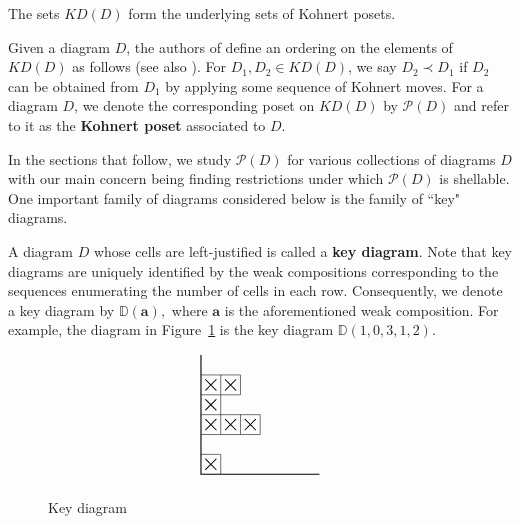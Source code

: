 \documentclass[letterpaper,10pt]{article}
\begin{document}
\noindent
The sets $KD(D)$ form the underlying sets of Kohnert posets.

Given a diagram $D$, the authors of \textbf{\cite{KP2}} define an ordering on the elements of $KD(D)$ as follows (see also \textbf{\cite{KP3}}). For $D_1,D_2\in KD(D)$, we say $D_2\prec D_1$ if $D_2$ can be obtained from $D_1$ by applying some sequence of Kohnert moves. For a diagram $D$, we denote the corresponding poset on $KD(D)$ by $\mathcal{P}(D)$ and refer to it as the \textbf{Kohnert poset} associated to $D$. 

 
In the sections that follow, we study $\mathcal{P}(D)$ for various collections of diagrams $D$ with our main concern being finding restrictions under which $\mathcal{P}(D)$ is shellable. One important family of diagrams considered below is the family of ``key" diagrams.

A diagram $D$ whose cells are left-justified is called a \textbf{key diagram}. Note that key diagrams are uniquely identified by the weak compositions corresponding to the sequences enumerating the number of cells in each row. Consequently, we denote a key diagram by $\mathbb{D}(\mathbf{a}),$ where $\mathbf{a}$ is the aforementioned weak composition. For example, the diagram in Figure~\ref{fig:swex} is the key diagram $\mathbb{D}(1,0,3,1,2).$ 


\begin{figure}[H]
    $$\begin{tikzpicture}[scale=0.5]
    \draw[thick] (6,0)--(0,0)--(0,6);
        \draw (0,1)--(1,1)--(1,0);
        \draw (0,2)--(3,2)--(3,3)--(0,3);
        \draw (1,2)--(1,3);
        \draw (2,2)--(2,3);
        \draw (0,4)--(1,4)--(1,3);
        \draw (0,5)--(2,5)--(2,4)--(1,4)--(1,5);

        \node at (.5,.5){$\bigtimes$};
        \node at (.5,2.5){$\bigtimes$};
        \node at (1.5,2.5){$\bigtimes$};
        \node at (2.5,2.5){$\bigtimes$};
        \node at (.5,3.5){$\bigtimes$};
        \node at (.5,4.5){$\bigtimes$};
        \node at (1.5,4.5){$\bigtimes$};
    \end{tikzpicture}$$
    \caption{Key diagram}
    \label{fig:swex}
\end{figure}

\end{document}
